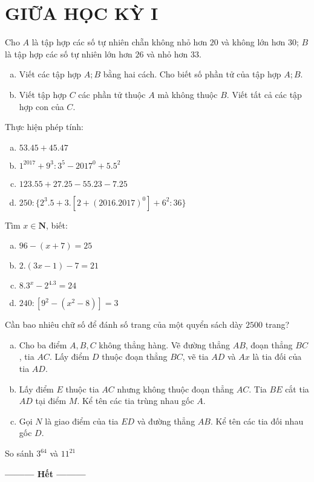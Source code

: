 \section{GIỮA HỌC KỲ I}
\setcounter{ex}{0}
\begin{ex} Cho $A$ là tập hợp các số tự nhiên chẵn không nhỏ hơn $20$ và không lớn hơn $30$; $B$ là tập hợp các số tự nhiên lớn hơn $26$ và nhỏ hơn $33$.
	\begin{enumerate}[a)]
		\item Viết các tập hợp $A; B$ bằng hai cách. Cho biết số phần tử của tập hợp $A; B$.
		\item Viết tập hợp $C$ các phần tử thuộc $A$ mà không thuộc $B$. Viết tất cả các tập hợp con của $C$.
	\end{enumerate}
\end{ex}    \begin{ex} Thực hiện phép tính:
		\begin{enumerate}[a)]
			\item $53.45 + 45.47$
			\item ${1^{2017}} + {9^3}:{3^5} - {2017^0} + 5.{5^2}$
			\item $123.55 + 27.25 - 55.23 - 7.25$
			\item $250:\{{2^3}.5 + 3.[2 + ({2016.2017})^0] + {6^2}:36\}$
	\end{enumerate}
\end{ex}    \begin{ex} Tìm $x \in \mathbf{N}$, biết:
	\begin{enumerate}[a)]
		\item $96 - (x + 7) = 25$
		\item $2.(3x - 1) - 7 = 21$
		\item $8.3^x - 2^4.3 = 24$
		\item $240:[9^2 - (x^2 - 8)] = 3$
	\end{enumerate}
\end{ex}    \begin{ex} Cần bao nhiêu chữ số để đánh số trang của một quyển sách dày $2500$ trang? \\
\end{ex}    \begin{ex}
	\begin{enumerate}[a)]
			\item Cho ba điểm $A, B, C$ không thẳng hàng. Vẽ đường thẳng $AB$, đoạn thẳng $BC$, tia $AC$. Lấy điểm $D$ thuộc đoạn thẳng $BC$, vẽ tia $AD$ và $Ax$ là tia đối của tia $AD$.
			\item Lấy điểm $E$ thuộc tia $AC$ nhưng không thuộc đoạn thẳng $AC$. Tia $BE$ cắt tia $AD$ tại điểm $M$. Kể tên các tia trùng nhau gốc $A$.
			\item Gọi $N$ là giao điểm của tia $ED$ và đường thẳng $AB$. Kể tên các tia đối nhau gốc $D$. 
		\end{enumerate}
\end{ex}    \begin{ex} So sánh $3^{64}$ và $11^{21}$
\end{ex}
\begin{center}
\textbf{\textbf{---------} Hết \textbf{---------}}
\end{center}